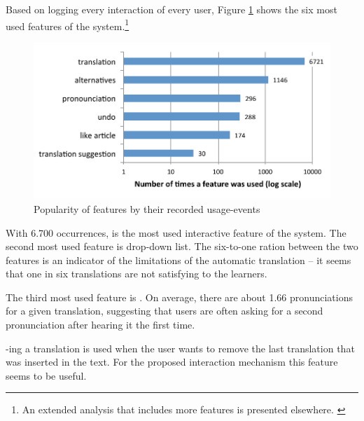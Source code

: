 Based on logging every interaction of every user, Figure \ref{fig:feature_usage} shows the six most used features of the system.\footnote{An extended analysis that includes more features is presented elsewhere. \cite{Chirtoaca17-apollo}}

  \begin{figure}[h!]
  \centering
    \includegraphics[width=0.6\columnwidth]{figures/reader_feature_usage}
    \caption{Popularity of features by their recorded usage-events}
    \label{fig:feature_usage}
  \end{figure}

With 6.700 occurrences,  is the most used interactive feature of the system. The second most used feature is  drop-down list. The six-to-one ration between the two features is an indicator of the limitations of the automatic translation -- it seems that one in six translations are not satisfying to the learners.

The third most used feature is . On average, there are about 1.66 pronunciations for a given translation, suggesting that users are often asking for a second pronunciation after hearing it the first time. 




-ing a translation is used when the user wants to remove the last translation that was inserted in the text. For the proposed interaction mechanism this feature seems to be useful. 

